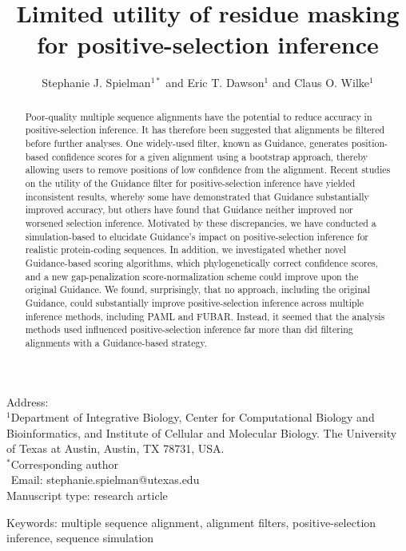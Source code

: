 \documentclass[10pt]{article}
\begin{document}
\title{\textbf{Limited utility of residue masking for positive-selection inference}}
\author{Stephanie J. Spielman$^{1*}$ and Eric T. Dawson$^{1}$ and Claus O. Wilke$^{1}$}
\date{}

\maketitle
\noindent
Address:\\
$^1$Department of Integrative Biology, Center for Computational Biology and Bioinformatics, and Institute of Cellular and Molecular Biology.
The University of Texas at Austin, Austin, TX 78731, USA.\\

\bigskip
\noindent
$^*$Corresponding author\\
$\phantom{^*}$Email: stephanie.spielman@utexas.edu\\

\bigskip
\noindent
Manuscript type: research article

\bigskip
\noindent Keywords: multiple sequence alignment, alignment filters, positive-selection inference, sequence simulation

\newpage
\begin{abstract}
Poor-quality multiple sequence alignments have the potential to reduce accuracy in positive-selection inference. It has therefore been suggested that alignments be filtered before further analyses. One widely-used filter, known as Guidance, generates position-based confidence scores for a given alignment using a bootstrap approach, thereby allowing users to remove positions of low confidence from the alignment. Recent studies on the utility of the Guidance filter for positive-selection inference have yielded inconsistent results, whereby some have demonstrated that Guidance substantially improved accuracy, but others have found that Guidance neither improved nor worsened selection inference. Motivated by these discrepancies, we have conducted a simulation-based to elucidate Guidance's impact on positive-selection inference for realistic protein-coding sequences. In addition, we investigated whether novel Guidance-based scoring algorithms, which phylogenetically correct confidence scores, and a new gap-penalization score-normalization scheme could improve upon the original Guidance. We found, surprisingly, that no approach, including the original Guidance, could substantially improve positive-selection inference across multiple inference methods, including PAML and FUBAR. Instead, it seemed that the analysis methods used influenced positive-selection inference far more than did filtering alignments with a Guidance-based strategy.
\end{abstract}
\end{document}
